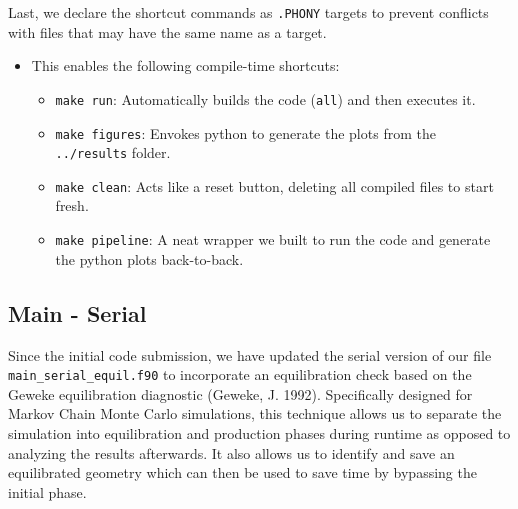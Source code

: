 Last, we declare the shortcut commands as \texttt{.PHONY} targets to
prevent conflicts with files that may have the same name as a target.

\begin{Shaded}
\begin{Highlighting}[]

\ErrorTok{    }
    \CharTok{$(}\CharTok{)}

\ErrorTok{    }

\DataTypeTok{ }
\ErrorTok{    }\CharTok{$(}\CharTok{)}\CharTok{$(}\CharTok{)}\CharTok{$(}\CharTok{)}

\ErrorTok{    }\CharTok{$(}\CharTok{)}
    \CharTok{$(}\CharTok{)}
\end{Highlighting}
\end{Shaded}

\begin{itemize}
\tightlist
\item
  This enables the following compile-time shortcuts:

  \begin{itemize}
  \tightlist
  \item
    \texttt{make\ run}: Automatically builds the code (\texttt{all}) and
    then executes it.
  \item
    \texttt{make\ figures}: Envokes python to generate the plots from
    the \texttt{../results} folder.
  \item
    \texttt{make\ clean}: Acts like a reset button, deleting all
    compiled files to start fresh.
  \item
    \texttt{make\ pipeline}: A neat wrapper we built to run the code and
    generate the python plots back-to-back.
  \end{itemize}
\end{itemize}

\subsection{Main - Serial}\label{main---serial}

Since the initial code submission, we have updated the serial version of
our file \texttt{main\_serial\_equil.f90} to incorporate an
equilibration check based on the Geweke equilibration diagnostic
(Geweke, J. 1992). Specifically designed for Markov Chain Monte Carlo
simulations, this technique allows us to separate the simulation into
equilibration and production phases during runtime as opposed to
analyzing the results afterwards. It also allows us to identify and save
an equilibrated geometry which can then be used to save time by
bypassing the initial phase.

